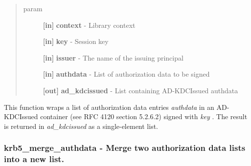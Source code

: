 \documentclass[letterpaper,10pt,english]{sphinxmanual}
\begin{document}
\begin{fulllineitems}
\label{appdev/refs/api/krb5_make_authdata_kdc_issued:krb5_make_authdata_kdc_issued}
\end{fulllineitems}

\begin{quote}\begin{description}
\item[{param}] \leavevmode
\textbf{{[}in{]}} \textbf{context} - Library context

\textbf{{[}in{]}} \textbf{key} - Session key

\textbf{{[}in{]}} \textbf{issuer} - The name of the issuing principal

\textbf{{[}in{]}} \textbf{authdata} - List of authorization data to be signed

\textbf{{[}out{]}} \textbf{ad\_kdcissued} - List containing AD-KDCIssued authdata

\end{description}\end{quote}

This function wraps a list of authorization data entries \emph{authdata} in an AD-KDCIssued container (see RFC 4120 section 5.2.6.2) signed with \emph{key} . The result is returned in \emph{ad\_kdcissued} as a single-element list.


\subsubsection{krb5\_merge\_authdata -  Merge two authorization data lists into a new list.}
\label{appdev/refs/api/krb5_merge_authdata:krb5-merge-authdata-merge-two-authorization-data-lists-into-a-new-list}\label{appdev/refs/api/krb5_merge_authdata::doc}

\begin{fulllineitems}
\label{appdev/refs/api/krb5_merge_authdata:krb5_merge_authdata}
\end{fulllineitems}
\end{document}

